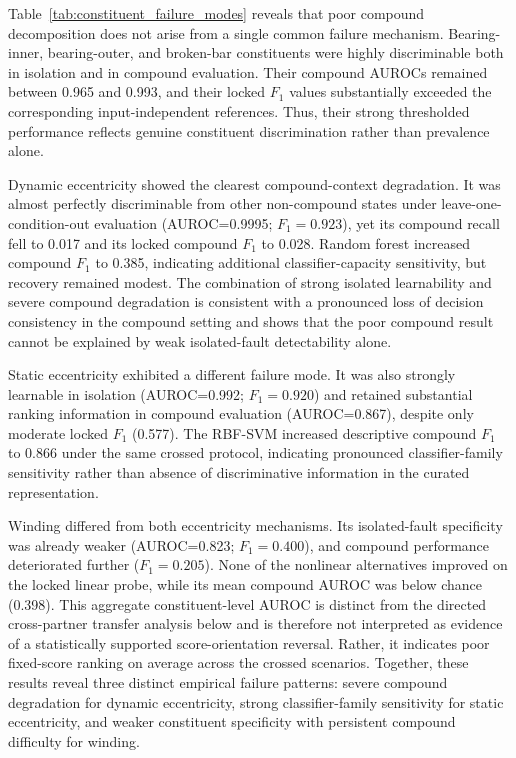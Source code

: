 \documentclass{ieeeaccess}
\begin{document}
Table~\ref{tab:constituent_failure_modes} reveals that poor compound
decomposition does not arise from a single common failure mechanism.
Bearing-inner, bearing-outer, and broken-bar constituents were highly
discriminable both in isolation and in compound evaluation. Their compound
AUROCs remained between 0.965 and 0.993, and their locked $F_1$ values
substantially exceeded the corresponding input-independent references.
Thus, their strong thresholded performance reflects genuine constituent
discrimination rather than prevalence alone.

Dynamic eccentricity showed the clearest compound-context degradation.
It was almost perfectly discriminable from other non-compound states under
leave-one-condition-out evaluation (AUROC=0.9995; $F_1=0.923$), yet its
compound recall fell to 0.017 and its locked compound $F_1$ to 0.028.
Random forest increased compound $F_1$ to 0.385, indicating additional
classifier-capacity sensitivity, but recovery remained modest. The combination
of strong isolated learnability and severe compound degradation is consistent
with a pronounced loss of decision consistency in the compound setting and
shows that the poor compound result cannot be explained by weak
isolated-fault detectability alone.

Static eccentricity exhibited a different failure mode. It was also strongly learnable in isolation (AUROC=0.992; $F_1=0.920$) and retained substantial
ranking information in compound evaluation (AUROC=0.867), despite only
moderate locked $F_1$ (0.577). The RBF-SVM increased descriptive compound
$F_1$ to 0.866 under the same crossed protocol, indicating pronounced
classifier-family sensitivity rather than absence of discriminative
information in the curated representation.

Winding differed from both eccentricity mechanisms. Its isolated-fault specificity was already weaker (AUROC=0.823; $F_1=0.400$), and compound performance deteriorated further ($F_1=0.205$). None of the nonlinear alternatives improved on the locked linear probe, while
its mean compound AUROC was below chance (0.398). This aggregate
constituent-level AUROC is distinct from the directed cross-partner transfer
analysis below and is therefore not interpreted as evidence of a statistically
supported score-orientation reversal. Rather, it indicates poor fixed-score
ranking on average across the crossed scenarios. Together, these results
reveal three distinct empirical failure patterns: severe compound degradation
for dynamic eccentricity, strong classifier-family sensitivity for static
eccentricity, and weaker constituent specificity with persistent compound
difficulty for winding.
\end{document}
